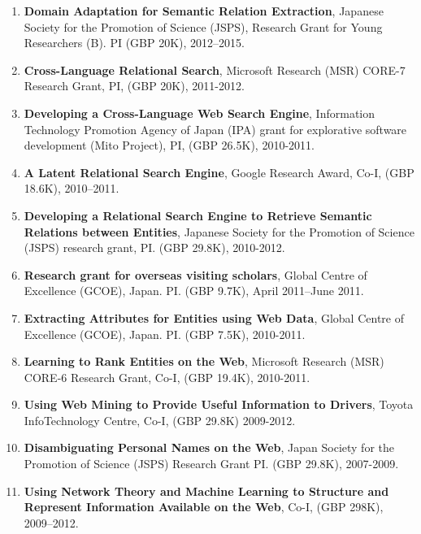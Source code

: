 \documentclass[a4paper,11pt]{article}
\begin{document}
\begin{enumerate}
\item \textbf{Domain Adaptation for Semantic Relation Extraction}, Japanese Society for the Promotion of Science (JSPS), Research Grant for Young Researchers (B). PI (GBP 20K), 2012–2015.

\item \textbf{Cross-Language Relational Search}, Microsoft Research (MSR) CORE-7 Research Grant, PI, (GBP 20K), 2011-2012.

\item \textbf{Developing a Cross-Language Web Search Engine}, Information Technology Promotion Agency of Japan (IPA) grant for explorative software development (Mito Project), PI, (GBP 26.5K), 2010-2011.

\item \textbf{A Latent Relational Search Engine}, Google Research Award, Co-I, (GBP 18.6K), 2010–2011.

\item \textbf{Developing a Relational Search Engine to Retrieve Semantic Relations between Entities}, Japanese Society for the Promotion of Science (JSPS) research grant, PI. (GBP 29.8K), 2010-2012.

\item \textbf{Research grant for overseas visiting scholars}, Global Centre of Excellence (GCOE), Japan. PI. (GBP 9.7K), April 2011–June 2011.

\item \textbf{Extracting Attributes for Entities using Web Data}, Global Centre of Excellence (GCOE), Japan. PI. (GBP 7.5K), 2010-2011.

\item \textbf{Learning to Rank Entities on the Web}, Microsoft Research (MSR) CORE-6 Research Grant, Co-I, (GBP 19.4K), 2010-2011.

\item \textbf{Using Web Mining to Provide Useful Information to Drivers}, Toyota InfoTechnology Centre, Co-I, (GBP 29.8K) 2009-2012.

\item \textbf{Disambiguating Personal Names on the Web}, Japan Society for the Promotion of Science (JSPS) Research Grant PI. (GBP 29.8K), 2007-2009.

\item \textbf{Using Network Theory and Machine Learning to Structure and Represent Information Available on the Web}, Co-I, (GBP 298K), 2009–2012.
\end{enumerate}
\end{document}

